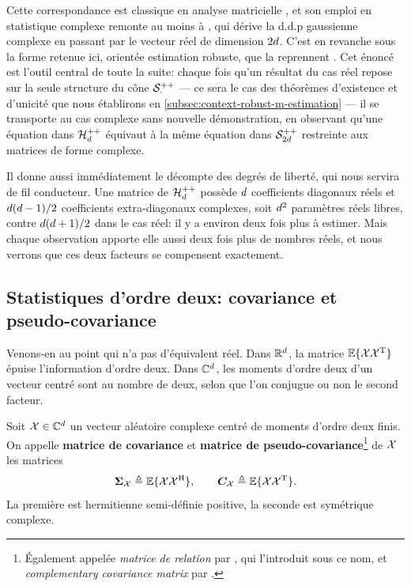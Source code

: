   Cette correspondance est classique en analyse matricielle , et son emploi en statistique complexe remonte au moins à , qui dérive la d.d.p gaussienne complexe en passant par le vecteur réel de dimension $2d$. C'est en revanche sous la forme retenue ici, orientée estimation robuste, que la reprennent \cite{6263313}. Cet énoncé est l'outil central de toute la suite: chaque fois qu'un résultat du cas réel repose sur la seule structure du cône $\mathcal{S}_{\cdot}^{++}$ — ce sera le cas des théorèmes d'existence et d'unicité que nous établirons en \cref{subsec:context-robust-m-estimation} — il se transporte au cas complexe sans nouvelle démonstration, en observant qu'une équation dans $\mathcal{H}_{d}^{++}$ équivaut à la même équation dans $\mathcal{S}_{2d}^{++}$ restreinte aux matrices de forme complexe.

  \begin{remark}
  Il donne aussi immédiatement le décompte des degrés de liberté, qui nous servira de fil conducteur. Une matrice de $\mathcal{H}_{d}^{++}$ possède $d$ coefficients diagonaux réels et $d(d-1)/2$ coefficients extra-diagonaux complexes, soit $d^2$ paramètres réels libres, contre $d(d+1)/2$ dans le cas réel: il y a environ deux fois plus à estimer. Mais chaque observation apporte elle aussi deux fois plus de nombres réels, et nous verrons que ces deux facteurs se compensent exactement.
\end{remark}

\subsection{Statistiques d'ordre deux: covariance et pseudo-covariance}

Venons-en au point qui n'a pas d'équivalent réel. Dans $\mathbb{R}^d$, la matrice $\operatorname{\mathbb{E}}\{\mathcal{X}\mathcal{X}^{\mathrm{T}}\}$ épuise l'information d'ordre deux. Dans $\mathbb{C}^d$, les moments d'ordre deux d'un vecteur centré sont au nombre de deux, selon que l'on conjugue ou non le second facteur.

\begin{definition}
\label{def:context-complex-pseudocov}
  Soit $\mathcal{X}\in\mathbb{C}^d$ un vecteur aléatoire complexe centré de moments d'ordre deux finis. On appelle \textbf{matrice de covariance} et \textbf{matrice de pseudo-covariance}\footnote{Également appelée \emph{matrice de relation} par \cite{Picinbono1996}, qui l'introduit sous ce nom, et \emph{complementary covariance matrix} par \cite{SchreierScharf2010}.} de $\mathcal{X}$ les matrices
\begin{equation}
  \boldsymbol{\Sigma}_{\mathcal{X}} \triangleq \operatorname{\mathbb{E}}\{\mathcal{X}\mathcal{X}^{\mathrm{H}}\},
  \qquad
  \boldsymbol{C}_{\mathcal{X}} \triangleq \operatorname{\mathbb{E}}\{\mathcal{X}\mathcal{X}^{\mathrm{T}}\}.
  \label{eq:context-complex-covpcov}
\end{equation}
  La première est hermitienne semi-définie positive, la seconde est symétrique complexe.
\end{definition}

